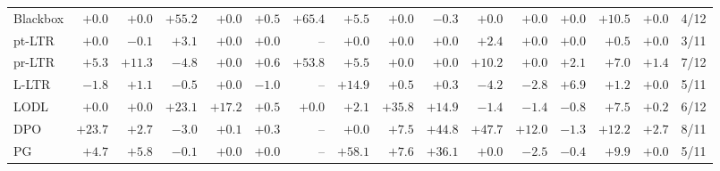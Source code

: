 \begin{table}[t]
\begin{tabular}{@{}lrrrrrrrrrrrrrrr@{}}
Blackbox & $+0.0$ & $+0.0$ & \cellcolor{green!28}$+55.2$ & $+0.0$ & $+0.5$ & \cellcolor{green!28}$+65.4$ & \cellcolor{green!18}$+5.5$ & $+0.0$ & $-0.3$ & $+0.0$ & $+0.0$ & $+0.0$ & \cellcolor{green!18}$+10.5$ & $+0.0$ & 4/12 \\
pt-LTR & $+0.0$ & $-0.1$ & $+3.1$ & $+0.0$ & $+0.0$ & -- & $+0.0$ & $+0.0$ & $+0.0$ & $+2.4$ & $+0.0$ & $+0.0$ & $+0.5$ & $+0.0$ & 3/11 \\
pr-LTR & \cellcolor{green!18}$+5.3$ & \cellcolor{green!18}$+11.3$ & $-4.8$ & $+0.0$ & $+0.6$ & \cellcolor{green!28}$+53.8$ & \cellcolor{green!18}$+5.5$ & $+0.0$ & $+0.0$ & \cellcolor{green!18}$+10.2$ & $+0.0$ & $+2.1$ & \cellcolor{green!18}$+7.0$ & $+1.4$ & 7/12 \\
L-LTR & $-1.8$ & $+1.1$ & $-0.5$ & $+0.0$ & $-1.0$ & -- & \cellcolor{green!18}$+14.9$ & $+0.5$ & $+0.3$ & $-4.2$ & $-2.8$ & \cellcolor{green!18}$+6.9$ & $+1.2$ & $+0.0$ & 5/11 \\
LODL & $+0.0$ & $+0.0$ & \cellcolor{green!18}$+23.1$ & \cellcolor{green!18}$+17.2$ & $+0.5$ & $+0.0$ & $+2.1$ & \cellcolor{green!28}$+35.8$ & \cellcolor{green!18}$+14.9$ & $-1.4$ & $-1.4$ & $-0.8$ & \cellcolor{green!18}$+7.5$ & $+0.2$ & 6/12 \\
DPO & \cellcolor{green!18}$+23.7$ & $+2.7$ & $-3.0$ & $+0.1$ & $+0.3$ & -- & $+0.0$ & \cellcolor{green!18}$+7.5$ & \cellcolor{green!28}$+44.8$ & \cellcolor{green!28}$+47.7$ & \cellcolor{green!18}$+12.0$ & $-1.3$ & \cellcolor{green!18}$+12.2$ & $+2.7$ & 8/11 \\
PG & $+4.7$ & \cellcolor{green!18}$+5.8$ & $-0.1$ & $+0.0$ & $+0.0$ & -- & \cellcolor{green!28}$+58.1$ & \cellcolor{green!18}$+7.6$ & \cellcolor{green!28}$+36.1$ & $+0.0$ & $-2.5$ & $-0.4$ & \cellcolor{green!18}$+9.9$ & $+0.0$ & 5/11 \\
\bottomrule
\end{tabular}
\end{table}
